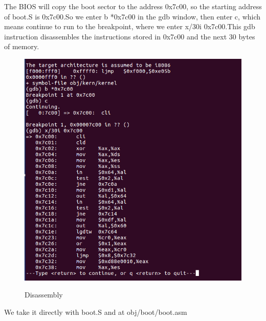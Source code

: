 The BIOS will copy the boot sector to the address 0x7c00, so the starting address of boot.S is 0x7c00.So we enter b *0x7c00 in the gdb window, then enter c, which means continue to run to the breakpoint, where we enter x/30i 0x7c00.This gdb instruction disassembles the instructions stored in 0x7c00 and the next 30 bytes of memory.
\begin{figure}[H]
  \centering
  \includegraphics[width=0.8\linewidth]{figure/set_breakpoint}\\
  \caption{Disassembly}\label{2}
\end{figure}

We take it directly with boot.S and at obj/boot/boot.asm

